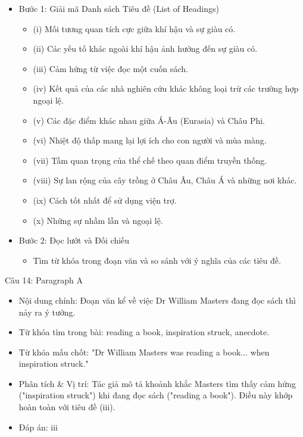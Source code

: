 \documentclass{../templateReading/cdreading}
\begin{document}
\begin{itemize}
\item Bước 1: Giải mã Danh sách Tiêu đề (List of Headings)
\begin{itemize}
\item (i) Mối tương quan tích cực giữa khí hậu và sự giàu có.
\item (ii) Các yếu tố khác ngoài khí hậu ảnh hưởng đến sự giàu có.
\item (iii) Cảm hứng từ việc đọc một cuốn sách.
\item (iv) Kết quả của các nhà nghiên cứu khác không loại trừ các trường hợp ngoại lệ.
\item (v) Các đặc điểm khác nhau giữa Á-Âu (Eurasia) và Châu Phi.
\item (vi) Nhiệt độ thấp mang lại lợi ích cho con người và mùa màng.
\item (vii) Tầm quan trọng của thể chế theo quan điểm truyền thống.
\item (viii) Sự lan rộng của cây trồng ở Châu Âu, Châu Á và những nơi khác.
\item (ix) Cách tốt nhất để sử dụng viện trợ.
\item (x) Những sự nhầm lẫn và ngoại lệ.
\end{itemize}
\item Bước 2: Đọc lướt và Đối chiếu
\begin{itemize}
\item Tìm từ khóa trong đoạn văn và so sánh với ý nghĩa của các tiêu đề.
\end{itemize}
\end{itemize}


Câu 14: Paragraph A
\begin{itemize}
\item Nội dung chính: Đoạn văn kể về việc Dr William Masters đang đọc sách thì nảy ra ý tưởng.
\item Từ khóa tìm trong bài: reading a book, inspiration struck, anecdote.
\item Từ khóa mấu chốt: "Dr William Masters was reading a book... when inspiration struck."
\item Phân tích \& Vị trí: Tác giả mô tả khoảnh khắc Masters tìm thấy cảm hứng ("inspiration struck") khi đang đọc sách ("reading a book"). Điều này khớp hoàn toàn với tiêu đề (iii).
\item Đáp án: iii
\end{itemize}
\end{document}
